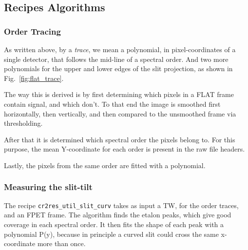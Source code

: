 \subsection{Recipes Algorithms} 
\label{sec:algorithms-recipes}


\subsubsection{Order Tracing}
\label{sec:ordertrace}

As written above, by a \emph{trace}, we mean a polynomial, in pixel-coordinates of a single detector, that follows the mid-line of a spectral order. And two more polynomials for the upper and lower edges of the slit projection, as shown in Fig.~\ref{fig:flat_trace}.

The way this is derived is by first determining which pixels in a FLAT frame contain signal, and which don't. To that end the image is smoothed first horizontally, then vertically, and then compared to the unsmoothed frame via thresholding.

After that it is determined which spectral order the pixels belong to. For this purpose, the mean Y-coordinate for each order is present in the raw file headers.

Lastly, the pixels from the same order are fitted with a polynomial.


\subsubsection{Measuring the slit-tilt}
\label{sec:tilt}

The recipe \verb!cr2res_util_slit_curv! takes as input a TW, for the order
traces, and an FPET frame. The algorithm finds the etalon peaks, which give good
coverage in each spectral order. It then fits the shape of each peak with a
polynomial P(y), because in principle a curved slit could cross the same
x-coordinate more than once.

